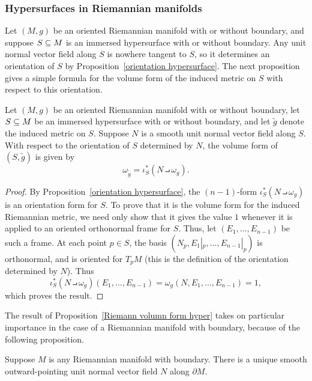 \subsubsection{Hypersurfaces in Riemannian manifolds}
Let $(M,g)$ be an oriented Riemannian manifold with or without boundary, and suppose $S\subseteq M$ is an immersed hypersurface with or without boundary. Any unit normal vector field along $S$ is nowhere tangent to $S$, so it determines an orientation of $S$ by Proposition~\ref{orientation hypersurface}. The next proposition gives a simple formula for the volume form of the induced metric on $S$ with respect to this orientation.
\begin{proposition}\label{Riemann volumn form hyper}
Let $(M,g)$ be an oriented Riemannian manifold with or without boundary, let $S\subseteq M$ be an immersed hypersurface with or without boundary, and let $\widetilde{g}$ denote the induced metric on $S$. Suppose $N$ is a smooth unit normal vector field along $S$. With respect to the orientation of $S$ determined by $N$, the volume form of $(S,\widetilde{g})$ is given by
\[\omega_{\widetilde{g}}=\iota_S^*(N\intprod\omega_g).\]
\end{proposition}
\begin{proof}
By Proposition~\ref{orientation hypersurface}, the $(n-1)$-form $\iota_S^*(N\intprod\omega_g)$ is an orientation form for $S$. To prove that it is the volume form for the induced Riemannian metric, we need only show that it gives the value $1$ whenever it is applied to an oriented orthonormal frame for $S$. Thus, let $(E_1,\dots,E_{n-1})$ be such a frame. At each point $p\in S$, the basis $(N_p,E_1|_p,\dots,E_{n-1}|_p)$ is orthonormal, and is oriented for $T_pM$ (this is the definition of the orientation determined by $N$). Thus 
\[\iota_S^*(N\intprod\omega_g)(E_1,\dots,E_{n-1})=\omega_g(N,E_1,\dots,E_{n-1})=1,\]
which proves the result.
\end{proof}
The result of Proposition~\ref{Riemann volumn form hyper} takes on particular importance in the case of a Riemannian manifold with boundary, because of the following proposition.
\begin{proposition}
Suppose $M$ is any Riemannian manifold with boundary. There is a unique smooth outward-pointing unit normal vector field $N$ along $\partial M$.
\end{proposition}
